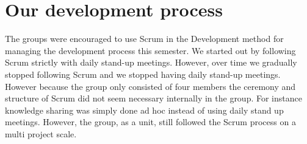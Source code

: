 \section{Our development process}
The groups were encouraged to use Scrum in the \giraf Development method for managing the development process this semester. We started out by following Scrum strictly with daily stand-up meetings. However, over time we gradually stopped following Scrum and we stopped having daily stand-up meetings. However because the group only consisted of four members the ceremony and structure of Scrum did not seem necessary internally in the group. For instance knowledge sharing was simply done ad hoc instead of using daily stand up meetings. However, the group, as a unit, still followed the Scrum process on a multi project scale.

